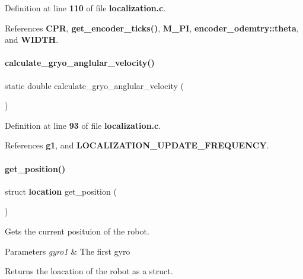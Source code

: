 Definition at line \textbf{ 110} of file \textbf{ localization.\+c}.



References \textbf{ C\+PR}, \textbf{ get\+\_\+encoder\+\_\+ticks()}, \textbf{ M\+\_\+\+PI}, \textbf{ encoder\+\_\+odemtry\+::theta}, and \textbf{ W\+I\+D\+TH}.

\mbox{\label{localization_8c_aa849dcc7cd296f4556fab3b57c1c4d3e}} 
\paragraph{calculate\+\_\+gryo\+\_\+anglular\+\_\+velocity()}
{\footnotesize\ttfamily static double calculate\+\_\+gryo\+\_\+anglular\+\_\+velocity (\begin{DoxyParamCaption}{ }\end{DoxyParamCaption})\hspace{0.3cm}{\ttfamily [static]}}



Definition at line \textbf{ 93} of file \textbf{ localization.\+c}.



References \textbf{ g1}, and \textbf{ L\+O\+C\+A\+L\+I\+Z\+A\+T\+I\+O\+N\+\_\+\+U\+P\+D\+A\+T\+E\+\_\+\+F\+R\+E\+Q\+U\+E\+N\+CY}.

\mbox{\label{localization_8c_aadbff35bb757f60bc348d4d778f57a2f}} 
\paragraph{get\+\_\+position()}
{\footnotesize\ttfamily struct \textbf{ location} get\+\_\+position (\begin{DoxyParamCaption}{ }\end{DoxyParamCaption})}



Gets the current posituion of the robot. 


\begin{DoxyParams}{Parameters}
{\em gyro1} & The first gyro \\
\hline
\end{DoxyParams}
\begin{DoxyReturn}{Returns}
the loacation of the robot as a struct. 
\end{DoxyReturn}


